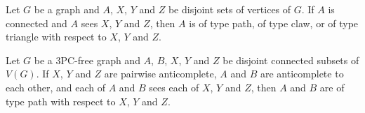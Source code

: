 \documentclass[10pt,a4paper]{amsart}
\begin{document}
\begin{lemma}
  \label{l:type}
  Let $G$ be a graph and $A$, $X$, $Y$ and $Z$ be disjoint sets of
  vertices of $G$.  If $A$ is connected and $A$ sees $X$, $Y$ and $Z$,
  then $A$ is of type path, of type claw, or of type triangle with
  respect to $X$, $Y$ and $Z$.
\end{lemma}

\begin{lemma}
  \label{l:OnePath}
  Let $G$ be a 3PC-free graph and $A$, $B$, $X$, $Y$ and $Z$ be
  disjoint connected subsets of $V(G)$. If $X$, $Y$ and $Z$ are
  pairwise anticomplete, $A$ and $B$ are anticomplete to each other,
  and each of $A$ and $B$ sees each of $X$, $Y$ and $Z$, then $A$ and $B$ are
  of type path with respect to $X$, $Y$ and $Z$.
\end{lemma}
\end{document}
